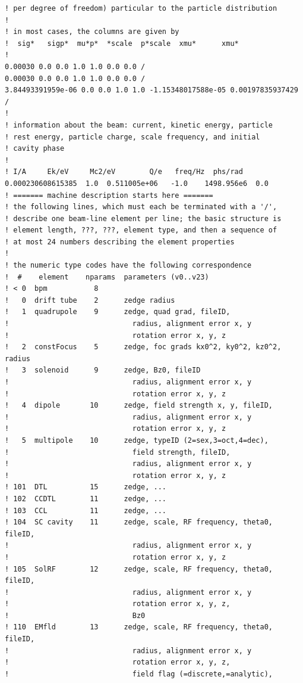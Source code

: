 \documentclass{psi-note}    %
\begin{document}
\begin{verbatim}
! per degree of freedom) particular to the particle distribution
!
! in most cases, the columns are given by
!  sig*   sigp*  mu*p*  *scale  p*scale  xmu*      xmu*
!
0.00030 0.0 0.0 1.0 1.0 0.0 0.0 /
0.00030 0.0 0.0 1.0 1.0 0.0 0.0 /
3.84493391959e-06 0.0 0.0 1.0 1.0 -1.15348017588e-05 0.00197835937429 /
!
! information about the beam: current, kinetic energy, particle
! rest energy, particle charge, scale frequency, and initial
! cavity phase
!
! I/A     Ek/eV     Mc2/eV        Q/e   freq/Hz  phs/rad
0.000230608615385  1.0  0.511005e+06   -1.0    1498.956e6  0.0
! ======= machine description starts here =======
! the following lines, which must each be terminated with a '/',
! describe one beam-line element per line; the basic structure is
! element length, ???, ???, element type, and then a sequence of
! at most 24 numbers describing the element properties
!
! the numeric type codes have the following correspondence
!  #    element    nparams  parameters (v0..v23)
! < 0  bpm           8
!   0  drift tube    2      zedge radius
!   1  quadrupole    9      zedge, quad grad, fileID,
!                             radius, alignment error x, y
!                             rotation error x, y, z
!   2  constFocus    5      zedge, foc grads kx0^2, ky0^2, kz0^2, radius
!   3  solenoid      9      zedge, Bz0, fileID
!                             radius, alignment error x, y
!                             rotation error x, y, z
!   4  dipole       10      zedge, field strength x, y, fileID,
!                             radius, alignment error x, y
!                             rotation error x, y, z
!   5  multipole    10      zedge, typeID (2=sex,3=oct,4=dec),
!                             field strength, fileID,
!                             radius, alignment error x, y
!                             rotation error x, y, z
! 101  DTL          15      zedge, ...
! 102  CCDTL        11      zedge, ...
! 103  CCL          11      zedge, ...
! 104  SC cavity    11      zedge, scale, RF frequency, theta0, fileID,
!                             radius, alignment error x, y
!                             rotation error x, y, z
! 105  SolRF        12      zedge, scale, RF frequency, theta0, fileID,
!                             radius, alignment error x, y
!                             rotation error x, y, z,
!                             Bz0
! 110  EMfld        13      zedge, scale, RF frequency, theta0, fileID,
!                             radius, alignment error x, y
!                             rotation error x, y, z,
!                             field flag (=discrete,=analytic),

\end{verbatim}
\end{document}
